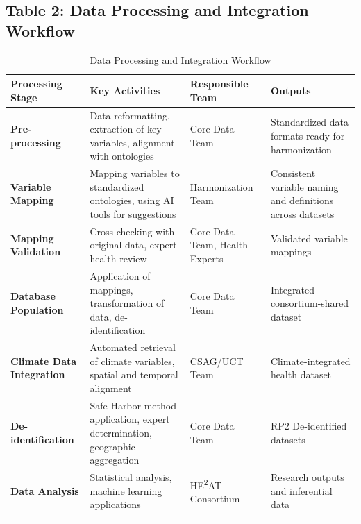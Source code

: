 \documentclass[12pt,a4paper,landscape]{article}
\begin{document}
\subsection*{Table 2: Data Processing and Integration Workflow}
\begin{longtable}{L{4cm}L{7cm}L{4cm}L{4.5cm}}
\toprule
\textbf{Processing Stage} & \textbf{Key Activities} & \textbf{Responsible Team} & \textbf{Outputs} \\
\midrule
\endhead

\textbf{Pre-processing} 
& Data reformatting, extraction of key variables, alignment with ontologies 
& Core Data Team 
& Standardized data formats ready for harmonization \\
\midrule

\textbf{Variable Mapping} 
& Mapping variables to standardized ontologies, using AI tools for suggestions 
& Harmonization Team 
& Consistent variable naming and definitions across datasets \\
\midrule

\textbf{Mapping Validation} 
& Cross-checking with original data, expert health review 
& Core Data Team, Health Experts 
& Validated variable mappings \\
\midrule

\textbf{Database Population} 
& Application of mappings, transformation of data, de-identification 
& Core Data Team 
& Integrated consortium-shared dataset \\
\midrule

\textbf{Climate Data Integration} 
& Automated retrieval of climate variables, spatial and temporal alignment 
& CSAG/UCT Team 
& Climate-integrated health dataset \\
\midrule

\textbf{De-identification} 
& Safe Harbor method application, expert determination, geographic aggregation 
& Core Data Team 
& RP2 De-identified datasets \\
\midrule

\textbf{Data Analysis} 
& Statistical analysis, machine learning applications 
& HE\textsuperscript{2}AT Consortium 
& Research outputs and inferential data \\
\bottomrule
\caption{Data Processing and Integration Workflow}
\end{longtable}
\clearpage

\end{document}
